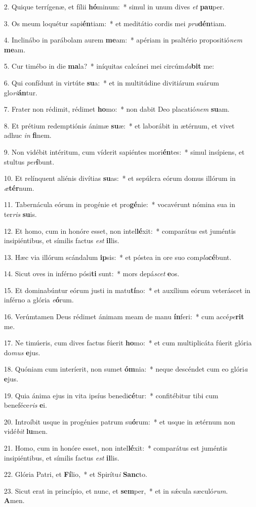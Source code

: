 2. Quique terrígenæ, et fílii \textbf{hó}minum:~*  simul in unum dives \textit{et} \textbf{pau}per.\

3. Os meum loquétur sapi\textbf{én}tiam:~*  et meditátio cordis mei \textit{pru}\textbf{dén}tiam.\

4. Inclinábo in parábolam aurem \textbf{me}am:~*  apériam in psaltério propositió\textit{nem} \textbf{me}am.\

5. Cur timébo in die \textbf{ma}la?~*  iníquitas calcánei mei circúm\textit{da}\textbf{bit} me:\

6. Qui confídunt in virtúte \textbf{su}a:~*  et in multitúdine divitiárum suárum glo\textit{ri}\textbf{án}tur.\

7. Frater non rédimit, rédimet \textbf{ho}mo:~*  non dabit Deo placatió\textit{nem} \textbf{su}am.\

8. Et prétium redemptiónis ánimæ \textbf{su}æ:~*  et laborábit in ætérnum, et vivet adhuc \textit{in} \textbf{fi}nem.\

9. Non vidébit intéritum, cum víderit sapiéntes mori\textbf{én}tes:~*  simul insípiens, et stultus \textit{per}\textbf{í}bunt.\

10. Et relínquent aliénis divítias \textbf{su}as:~*  et sepúlcra eórum domus illórum in \textit{æ}\textbf{tér}num.\

11. Tabernácula eórum in progénie et pro\textbf{gé}nie:~*  vocavérunt nómina sua in ter\textit{ris} \textbf{su}is.\

12. Et homo, cum in honóre esset, non intel\textbf{lé}xit:~*  comparátus est juméntis insipiéntibus, et símilis factus \textit{est} \textbf{il}lis.\

13. Hæc via illórum scándalum \textbf{ip}sis:~*  et póstea in ore suo com\textit{pla}\textbf{cé}bunt.\

14. Sicut oves in inférno pósi\textbf{ti} sunt:~*  mors depá\textit{scet} \textbf{e}os.\

15. Et dominabúntur eórum justi in matu\textbf{tí}no:~*  et auxílium eórum veteráscet in inférno a glória \textit{e}\textbf{ó}rum.\

16. Verúmtamen Deus rédimet ánimam meam de manu \textbf{ín}feri:~*  cum accé\textit{pe}\textbf{rit} me.\

17. Ne timúeris, cum dives factus fúerit \textbf{ho}mo:~*  et cum multiplicáta fúerit glória do\textit{mus} \textbf{e}jus.\

18. Quóniam cum interíerit, non sumet \textbf{óm}nia:~*  neque descéndet cum eo glóri\textit{a} \textbf{e}jus.\

19. Quia ánima ejus in vita ipsíus benedi\textbf{cé}tur:~*  confitébitur tibi cum beneféce\textit{ris} \textbf{e}i.\

20. Introíbit usque in progénies patrum su\textbf{ó}rum:~*  et usque in ætérnum non vidé\textit{bit} \textbf{lu}men.\

21. Homo, cum in honóre esset, non intel\textbf{lé}xit:~*  comparátus est juméntis insipiéntibus, et símilis factus \textit{est} \textbf{il}lis.\

22. Glória Patri, et \textbf{Fí}lio,~*  et Spirítu\textit{i} \textbf{Sanc}to.\

23. Sicut erat in princípio, et nunc, et \textbf{sem}per,~*  et in sǽcula sæculó\textit{rum}. \textbf{A}men.\

